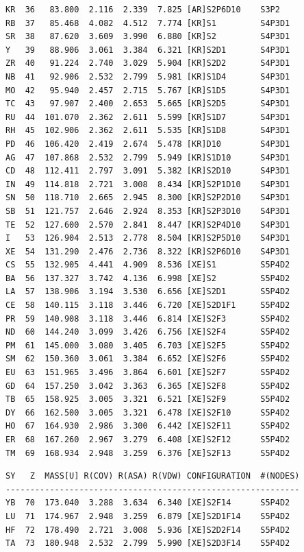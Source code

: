 \documentclass[final,12pt]{article}
\begin{document}
{{{{{{\begin{verbatim}
KR  36   83.800  2.116  2.339  7.825 [AR]S2P6D10    S3P2      
RB  37   85.468  4.082  4.512  7.774 [KR]S1         S4P3D1    
SR  38   87.620  3.609  3.990  6.880 [KR]S2         S4P3D1    
Y   39   88.906  3.061  3.384  6.321 [KR]S2D1       S4P3D1    
ZR  40   91.224  2.740  3.029  5.904 [KR]S2D2       S4P3D1    
NB  41   92.906  2.532  2.799  5.981 [KR]S1D4       S4P3D1    
MO  42   95.940  2.457  2.715  5.767 [KR]S1D5       S4P3D1    
TC  43   97.907  2.400  2.653  5.665 [KR]S2D5       S4P3D1    
RU  44  101.070  2.362  2.611  5.599 [KR]S1D7       S4P3D1    
RH  45  102.906  2.362  2.611  5.535 [KR]S1D8       S4P3D1    
PD  46  106.420  2.419  2.674  5.478 [KR]D10        S4P3D1    
AG  47  107.868  2.532  2.799  5.949 [KR]S1D10      S4P3D1    
CD  48  112.411  2.797  3.091  5.382 [KR]S2D10      S4P3D1    
IN  49  114.818  2.721  3.008  8.434 [KR]S2P1D10    S4P3D1    
SN  50  118.710  2.665  2.945  8.300 [KR]S2P2D10    S4P3D1    
SB  51  121.757  2.646  2.924  8.353 [KR]S2P3D10    S4P3D1    
TE  52  127.600  2.570  2.841  8.447 [KR]S2P4D10    S4P3D1    
I   53  126.904  2.513  2.778  8.504 [KR]S2P5D10    S4P3D1    
XE  54  131.290  2.476  2.736  8.322 [KR]S2P6D10    S4P3D1    
CS  55  132.905  4.441  4.909  8.536 [XE]S1         S5P4D2    
BA  56  137.327  3.742  4.136  6.998 [XE]S2         S5P4D2    
LA  57  138.906  3.194  3.530  6.656 [XE]S2D1       S5P4D2    
CE  58  140.115  3.118  3.446  6.720 [XE]S2D1F1     S5P4D2    
PR  59  140.908  3.118  3.446  6.814 [XE]S2F3       S5P4D2    
ND  60  144.240  3.099  3.426  6.756 [XE]S2F4       S5P4D2    
PM  61  145.000  3.080  3.405  6.703 [XE]S2F5       S5P4D2    
SM  62  150.360  3.061  3.384  6.652 [XE]S2F6       S5P4D2    
EU  63  151.965  3.496  3.864  6.601 [XE]S2F7       S5P4D2    
GD  64  157.250  3.042  3.363  6.365 [XE]S2F8       S5P4D2    
TB  65  158.925  3.005  3.321  6.521 [XE]S2F9       S5P4D2    
DY  66  162.500  3.005  3.321  6.478 [XE]S2F10      S5P4D2    
HO  67  164.930  2.986  3.300  6.442 [XE]S2F11      S5P4D2    
ER  68  167.260  2.967  3.279  6.408 [XE]S2F12      S5P4D2    
TM  69  168.934  2.948  3.259  6.376 [XE]S2F13      S5P4D2    
\end{verbatim}
\newpage
\begin{verbatim}
SY   Z  MASS[U] R(COV) R(ASA) R(VDW) CONFIGURATION  #(NODES)
------------------------------------------------------------
YB  70  173.040  3.288  3.634  6.340 [XE]S2F14      S5P4D2    
LU  71  174.967  2.948  3.259  6.879 [XE]S2D1F14    S5P4D2    
HF  72  178.490  2.721  3.008  5.936 [XE]S2D2F14    S5P4D2    
TA  73  180.948  2.532  2.799  5.990 [XE]S2D3F14    S5P4D2    

\end{verbatim}}}}}}}
\end{document}
